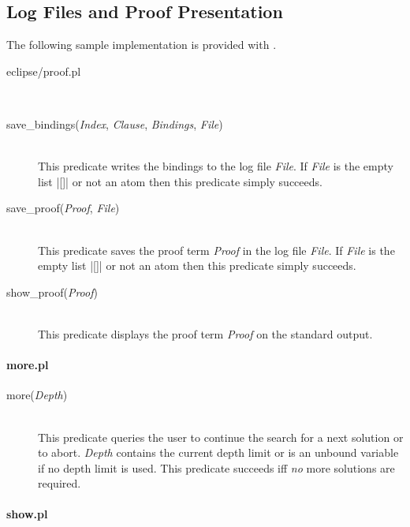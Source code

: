 \subsection{Log Files and Proof Presentation}\label{lib:proof}

The following sample implementation is provided with \ProCom.
\begin{description}
  \item [eclipse/proof.pl]\ 
\end{description}

\begin{description}
  \item [save\_bindings({\em Index}, {\em Clause}, {\em Bindings}, {\em
  File})]\index{save\_bindings}\ \\
  This predicate writes the bindings to the log file {\em File}. If {\em
  File} is the empty list |[]| or not an atom then this predicate simply
  succeeds.

  \item [save\_proof({\em Proof}, {\em File})]\ \\
  This predicate saves the proof term {\em Proof}\/ in the log file {\em
  File}. If {\em File}\/ is the empty list |[]| or not an atom then this
  predicate simply succeeds.

  \item [show\_proof({\em Proof})]\ \\
  This predicate displays the proof term {\em Proof} on the standard output.
\end{description}


\paragraph{more.pl}\label{lib:more}

\begin{description}
  \item [more({\em Depth})]\ \\
  This predicate queries the user to continue the search for a next solution
  or to abort. {\em Depth}\/ contains the current depth limit or is an unbound
  variable if no depth limit is used. This predicate succeeds iff {\em no}\/
  more solutions are required.
\end{description}


\paragraph{show.pl}\label{lib:show}


